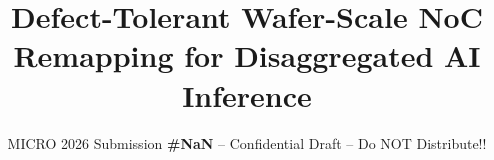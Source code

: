 \documentclass[sigconf, screen, review]{acmart}
\begin{document}
\title{Defect-Tolerant Wafer-Scale NoC Remapping for Disaggregated AI Inference}
\subtitle{\normalsize{MICRO 2026 Submission
    \textbf{\#NaN} -- Confidential Draft -- Do NOT Distribute!!}}

\begin{abstract}

%
%
%

\end{abstract}


\maketitle
\end{document}
